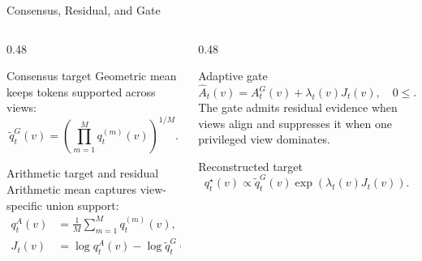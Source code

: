 \documentclass[aspectratio=169]{beamer}
\begin{document}
\begin{frame}{Consensus, Residual, and Gate}
  \footnotesize
  \begin{columns}[T,onlytextwidth]
    \begin{column}{0.48\textwidth}
      \begin{block}{Consensus target}
        Geometric mean keeps tokens supported across views:
        \[
          \widetilde{q}_t^G(v)=
          \left(\prod_{m=1}^{M}q_t^{(m)}(v)\right)^{1/M}.
        \]
      \end{block}
      \begin{block}{Arithmetic target and residual}
        Arithmetic mean captures view-specific union support:
        \[
          \begin{aligned}
            q_t^A(v)&=\frac{1}{M}\sum_{m=1}^{M}q_t^{(m)}(v),\\
            J_t(v)&=\log q_t^A(v)-\log \widetilde{q}_t^G(v).
          \end{aligned}
        \]
      \end{block}
    \end{column}
    \begin{column}{0.48\textwidth}
      \begin{block}{Adaptive gate}
        \[
          \widehat{A}_t(v)=A_t^G(v)+\lambda_t(v)J_t(v),
          \quad 0\leq\lambda_t(v)\leq1.
        \]
        The gate admits residual evidence when views align and suppresses it
        when one privileged view dominates.
      \end{block}
      \begin{block}{Reconstructed target}
        \[
          q_t^{\star}(v) \propto
          \widetilde{q}_t^G(v)\exp(\lambda_t(v)J_t(v)).
        \]
      \end{block}
    \end{column}
  \end{columns}
\end{frame}
\end{document}
